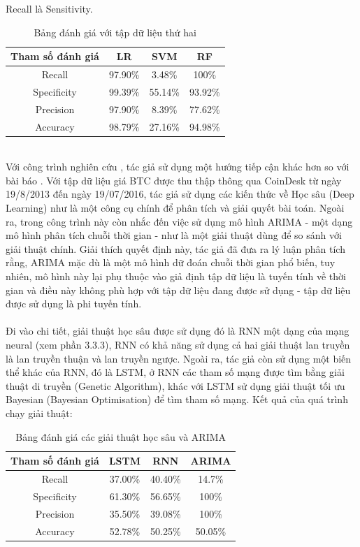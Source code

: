 Recall là Sensitivity.
\begin{table}[h]
\centering
\fontsize{8}{9}\selectfont
\begin{tabular}{ |c|c|c|c| }
\hline
Tham số đánh giá & LR & SVM & RF \\
\hline
Recall & 97.90\% & 3.48\% & 100\% \\
\hline
Specificity & 99.39\% & 55.14\% & 93.92\% \\
\hline
Precision & 97.90\% & 8.39\% & 77.62\% \\
\hline
Accuracy & 98.79\% & 27.16\% & 94.98\% \\
\hline
\end{tabular}
\caption{Bảng đánh giá với tập dữ liệu thứ hai}
\end{table}\\
Với công trình nghiên cứu \cite{PredictingThePriceOfBitcoin}, tác giả sử dụng 
một hướng tiếp cận khác hơn so với bài báo \cite{AutomatedBitcoinTrading}. Với 
tập dữ liệu giá BTC được thu thập thông qua CoinDesk từ ngày 19/8/2013 đến ngày 
19/07/2016, tác giả sử dụng các kiến thức về Học sâu (Deep Learning) như là một 
công cụ chính để phân tích và giải quyết bài toán. Ngoài ra, trong công trình 
này còn nhắc đến việc sử dụng mô hình ARIMA - một dạng mô hình phân tích chuỗi 
thời gian - như là một giải thuật dùng để so sánh với giải thuật chính. Giải 
thích quyết định này, tác giả đã đưa ra lý luận phân tích rằng, ARIMA mặc dù là 
một mô hình dữ đoán chuỗi thời gian phổ biến, tuy nhiên, mô hình này lại phụ 
thuộc vào giả định tập dữ liệu là tuyến tính về thời gian và điều này không phù 
hợp với tập dữ liệu đang được sử dụng - tập dữ liệu được sử dụng là phi tuyến 
tính.\\\\
Đi vào chi tiết, giải thuật học sâu được sử dụng đó là RNN một dạng của 
mạng neural (xem phần 3.3.3), RNN có khả năng sử dụng cả hai giải thuật lan 
truyền là lan truyền thuận và lan truyền ngược. Ngoài ra, tác giả còn sử dụng 
một biến thể khác của RNN, đó là LSTM, ở RNN các tham số mạng được tìm bằng 
giải thuật di truyền (Genetic Algorithm), khác với LSTM sử dụng giải thuật tối 
ưu Bayesian (Bayesian Optimisation) để tìm tham số mạng. Kết quả của quá trình 
chạy giải thuật:
\begin{table}[h]
\centering
\fontsize{8}{9}\selectfont
\begin{tabular}{ |c|c|c|c| }
\hline
Tham số đánh giá & LSTM & RNN & ARIMA \\
\hline
Recall & 37.00\% & 40.40\% & 14.7\% \\
\hline
Specificity & 61.30\% & 56.65\% & 100\% \\
\hline
Precision & 35.50\% & 39.08\% & 100\% \\
\hline
Accuracy & 52.78\% & 50.25\% & 50.05\% \\
\hline
\end{tabular}
\caption{Bảng đánh giá các giải thuật học sâu và ARIMA}
\end{table}\\
